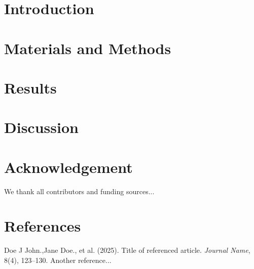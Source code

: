 \documentclass[11pt]{jabs}
\begin{document}
\clearpage

\pagestyle{mainstyle}
\setcounter{page}{1}




\section*{Introduction}
\lipsum[1-3]

\section*{Materials and Methods}
\lipsum[4-6]

\section*{Results}
\lipsum[7-9]

\section*{Discussion}
\lipsum[10-12]

\section*{Acknowledgement}
We thank all contributors and funding sources...

\section*{References}
\begin{thebibliography}{9}
 Doe J John.,Jane Doe., et al. (2025). Title of referenced article. \textit{Journal Name}, 8(4), 123–130.
 Another reference...
\end{thebibliography}
\end{document}
